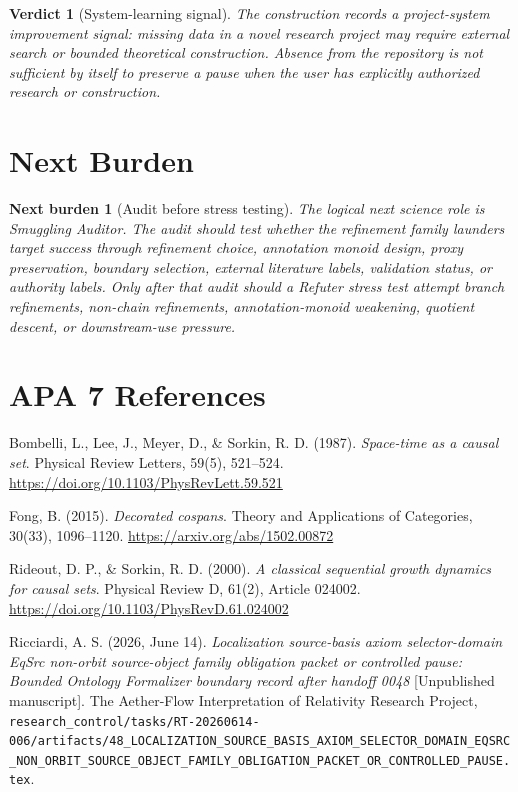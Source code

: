 \documentclass[11pt]{article}
\newtheorem{verdict}{Verdict}
\newtheorem{nextburden}{Next burden}
\begin{document}
\begin{verdict}[System-learning signal]
The construction records a project-system improvement signal: missing data
in a novel research project may require external search or bounded
theoretical construction. Absence from the repository is not sufficient by
itself to preserve a pause when the user has explicitly authorized research
or construction.
\end{verdict}

\section{Next Burden}

\begin{nextburden}[Audit before stress testing]
The logical next science role is Smuggling Auditor. The audit should test
whether the refinement family launders target success through refinement
choice, annotation monoid design, proxy preservation, boundary selection,
external literature labels, validation status, or authority labels. Only
after that audit should a Refuter stress test attempt branch refinements,
non-chain refinements, annotation-monoid weakening, quotient descent, or
downstream-use pressure.
\end{nextburden}

\section*{APA 7 References}

Bombelli, L., Lee, J., Meyer, D., \& Sorkin, R. D. (1987). \emph{Space-time
as a causal set}. Physical Review Letters, 59(5), 521--524.
\url{https://doi.org/10.1103/PhysRevLett.59.521}

Fong, B. (2015). \emph{Decorated cospans}. Theory and Applications of
Categories, 30(33), 1096--1120. \url{https://arxiv.org/abs/1502.00872}

Rideout, D. P., \& Sorkin, R. D. (2000). \emph{A classical sequential
growth dynamics for causal sets}. Physical Review D, 61(2), Article
024002. \url{https://doi.org/10.1103/PhysRevD.61.024002}

Ricciardi, A. S. (2026, June 14). \emph{Localization source-basis axiom
selector-domain EqSrc non-orbit source-object family obligation packet or
controlled pause: Bounded Ontology Formalizer boundary record after handoff
0048} [Unpublished manuscript]. The Aether-Flow Interpretation of
Relativity Research Project,
\texttt{research\_control/tasks/RT-20260614-006/artifacts/48\_LOCALIZATION\_SOURCE\_BASIS\_AXIOM\_SELECTOR\_DOMAIN\_EQSRC\_NON\_ORBIT\_SOURCE\_OBJECT\_FAMILY\_OBLIGATION\_PACKET\_OR\_CONTROLLED\_PAUSE.tex}.
\end{document}
